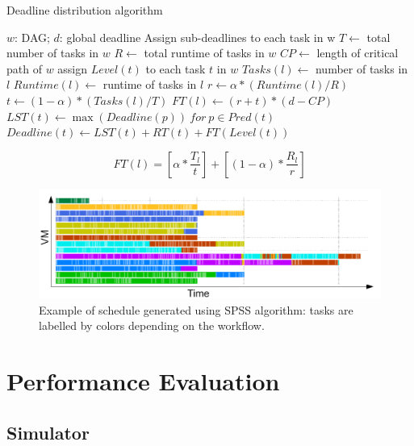 \documentclass{sig-alternate}
\begin{document}
\begin{algorithm}
\caption{Deadline distribution algorithm}
\label{alg:deadlinedistribution}
\begin{algorithmic}[1]
\Require $w$: DAG; $d$: global deadline
\Ensure Assign sub-deadlines to each task in w
    \State $T \gets$ total number of tasks in $w$
    \State $R \gets$ total runtime of tasks in $w$
    \State $CP \gets$ length of critical path of $w$
    \State assign $Level(t)$ to each task $t$ in $w$
        \State $Tasks(l) \gets$ number of tasks in $l$
        \State $Runtime(l) \gets$ runtime of tasks in $l$
        \State $r \gets \alpha * (Runtime(l)/R)$
        \State $t \gets (1-\alpha) * (Tasks(l)/T)$
        \State $FT(l) \gets (r + t) * (d - CP)$
    \EndFor
        \State $LST(t) \gets \max(Deadline(p))\ for\ p \in Pred(t)$
        \State $Deadline(t) \gets LST(t) + RT(t) + FT(Level(t))$
    \EndFor
\EndProcedure
\end{algorithmic} 
\end{algorithm}

\begin{equation}
\label{eq:scaling}
FT(l) = \left[{\alpha}*\frac{T_l}{t}\right] + \left[{(1 - \alpha)}*\frac{R_l}{r} \right]
\end{equation}

\begin{figure}[htb] 
\centering
\includegraphics[width=1.0\columnwidth]{figures/spss-gantt}
 \caption{Example of schedule generated using SPSS algorithm: tasks are labelled
 by colors depending on the workflow. }
\label{fig:spss-example}
\end{figure}


\section{Performance Evaluation}

\subsection{Simulator}
\end{document}
